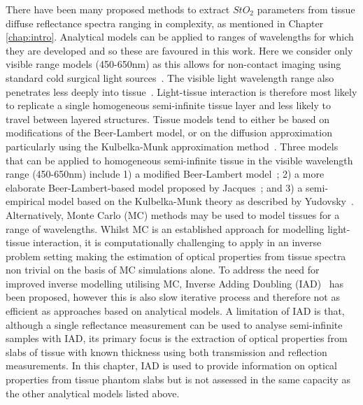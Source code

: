 There have been many proposed methods to extract $StO_2$ parameters from tissue diffuse reflectance spectra ranging in complexity, as mentioned in Chapter \ref{chap:intro}.
Analytical models can be applied to ranges of wavelengths for which they are developed and so these are favoured in this work. 
Here we consider only visible range models (450-650nm) as this allows for non-contact imaging using standard cold surgical light sources~\citep{Clancy2011}.
The visible light wavelength range also penetrates less deeply into tissue~\citep{Eggert1987, Sabino2016}. Light-tissue interaction is therefore most likely to replicate a single homogeneous semi-infinite tissue layer and less likely to travel between layered structures.
Tissue models tend to either be based on modifications of the Beer-Lambert model, or on the diffusion approximation particularly using the Kulbelka-Munk approximation method~\citep{MacKenzie2018}. Three models that can be applied to homogeneous semi-infinite tissue in the visible wavelength range (450-650nm) include 1) a modified Beer-Lambert model~\citep{Clancy2015}; 2) a more elaborate Beer-Lambert-based model proposed by Jacques~\citep{Jacques1999}; and 3) a semi-empirical model based on the Kulbelka-Munk theory as described by Yudovsky~\citep{Yudovsky2009}.
Alternatively, Monte Carlo (MC) methods may be used to model tissues for a range of wavelengths. Whilst MC is an established approach for modelling light-tissue interaction, it is computationally challenging to apply in an inverse problem setting making the estimation of optical properties from tissue spectra non trivial on the basis of MC simulations alone.
To address the need for improved inverse modelling utilising MC, Inverse Adding Doubling (IAD)~\citep{Prahl2017, Milanic2024} has been proposed, however this is also slow iterative process and therefore not as efficient as approaches based on analytical models.
A limitation of IAD is that, although a single reflectance measurement can be used to analyse semi-infinite samples with IAD, its primary focus is the extraction of optical properties from slabs of tissue with known thickness using both transmission and reflection measurements.
In this chapter, IAD is used to provide information on optical properties from tissue phantom slabs but is not assessed in the same capacity as the other 
analytical models listed above. 

